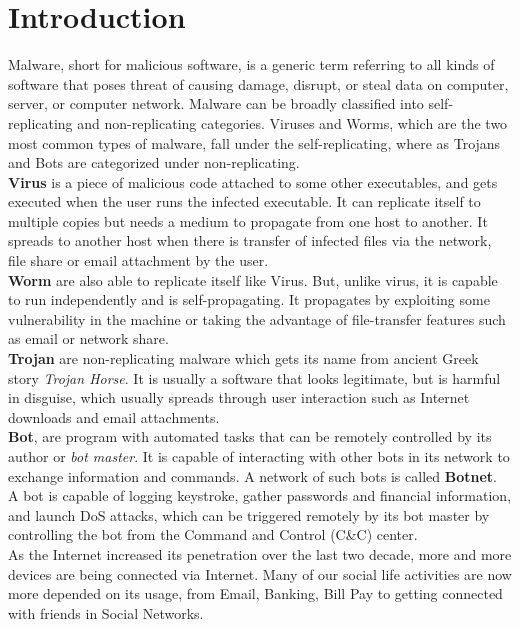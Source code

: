 \chapter{Introduction}\label{chapter:introduction}
Malware, short for malicious software, is a generic term referring to all kinds of software that poses threat of causing damage, disrupt, or steal data on computer, server, or computer network.
Malware can be broadly classified into self-replicating and non-replicating categories.
Viruses and Worms, which are the two most common types of malware, fall under the self-replicating, where as Trojans and Bots are categorized under non-replicating.\\
\textbf{Virus} is a piece of malicious code attached to some other executables, and gets executed when the user runs the infected executable.
It can replicate itself to multiple copies but needs a medium to propagate from one host to another.
It spreads to another host when there is transfer of infected files via the network, file share or email attachment by the user.\\
\textbf{Worm} are also able to replicate itself like Virus.
But, unlike virus, it is capable to run independently and is self-propagating.
It propagates by exploiting some vulnerability in the machine or taking the advantage of file-transfer features such as email or network share.\\
\textbf{Trojan} are non-replicating malware which gets its name from ancient Greek story \textit{Trojan Horse}.
It is usually a software that looks legitimate, but is harmful in disguise, which usually spreads through user interaction such as Internet downloads and email attachments.\\
\textbf{Bot}, are program with automated tasks that can be remotely controlled by its author or \emph{bot master}.
It is capable of interacting with other bots in its network to exchange information and commands.
A network of such bots is called \textbf{Botnet}.
A bot is capable of logging keystroke, gather passwords and financial information, and launch DoS attacks, which can be triggered remotely by its bot master by controlling the bot from the Command and Control (C\&C) center.\\
As the Internet increased its penetration over the last two decade, more and more devices are being connected via Internet.
Many of our social life activities are now more depended on its usage, from Email, Banking, Bill Pay to getting connected with friends in Social Networks.
